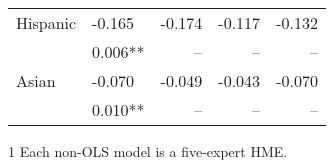 \documentclass[12pt]{article}
\begin{document}
\begin{table}
\begin{threeparttable}
\begin{tabular}[l]{l l r r r}
      Hispanic    & -0.165   & -0.174  & -0.117  & -0.132 \\
                  & 0.006**  & --      & --      & --     \\[0.3cm]

      Asian       & -0.070   & -0.049  & -0.043  & -0.070 \\
                  & 0.010**  & --      & --      & --     \\[0.3cm]


      \hline
    \end{tabular}
    \begin{tablenotes}
      \item[1]{\footnotesize Each non-OLS model is a five-expert HME.}
    \end{tablenotes} \label{tbl:model_marg_effects}
  \end{threeparttable}
\end{table}
\end{document}
